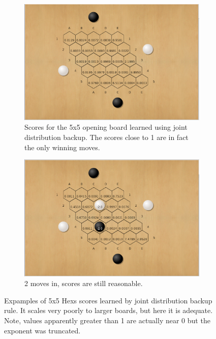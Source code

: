 \documentclass{article}
\begin{document}
\begin{figure}[!ht]
\centering
\begin{subfigure}[t]{.45\textwidth}
  \centering
      \includegraphics[width=1\textwidth]{pics/5x5_Hex_opening.png}
  \caption{Scores for the 5x5 opening board learned using joint distribution backup. The scores close to 1 are in fact the only winning moves.}
  \label{fig:5x5_1}
\end{subfigure}\hfill
\begin{subfigure}[t]{.45\textwidth}
  \centering
      \includegraphics[width=1\textwidth]{pics/5x5_Hex_2_moves.png}
  \caption{2 moves in, scores are still reasonable.}
  \label{fig:5x5_2}
\end{subfigure}
\caption{Expamples of 5x5 Hexs scores learned by joint distribution backup rule. It scales very poorly to larger boards, but here it is adequate. Note, values  apparently greater than 1 are actually near 0 but the exponent was truncated.}
\label{fig:5x5}
\end{figure}
\end{document}
